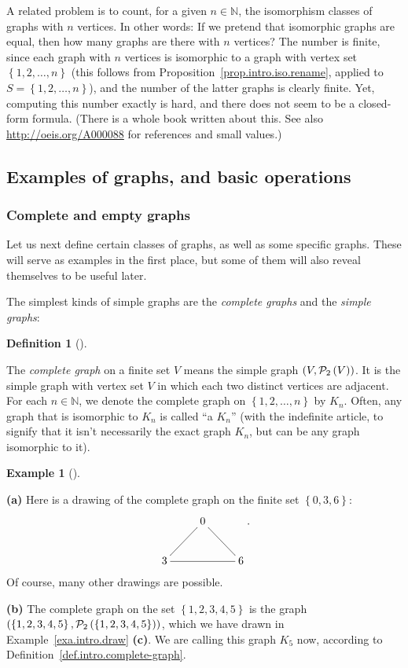 \documentclass[numbers=enddot,12pt,final,onecolumn,notitlepage]{scrartcl}%
\makeatletter
\theoremstyle{definition}
\newtheorem{defi}[theo]{Definition}
\newenvironment{definition}[1][]
{\begin{defi}[#1]\begin{leftbar}}
{\end{leftbar}\end{defi}}
\newtheorem{exam}[theo]{Example}
\newenvironment{example}[1][]
{\begin{exam}[#1]\begin{leftbar}}
{\end{leftbar}\end{exam}}
\newcommand{\NN}{\mathbb{N}}
\newcommand{\powset}[2][]{\ifthenelse{\equal{#2}{}}{\mathcal{P}\left(#1\right)}{\mathcal{P}_{#1}\left(#2\right)}}
\newcommand{\set}[1]{\left\{ #1 \right\}}
\newcommand{\tup}[1]{\left( #1 \right)}
\newcommand{\are}{\ar@{-}}
\makeatother
\begin{document}
A related problem is to count, for a given $n \in \NN$,
the isomorphism classes of graphs with $n$ vertices. In other words:
If we pretend that isomorphic graphs are equal, then how many graphs
are there with $n$ vertices? The number is finite, since each graph
with $n$ vertices is isomorphic to a graph with vertex set
$\set{1,2,\ldots, n}$ (this follows from
Proposition~\ref{prop.intro.iso.rename}, applied to
$S = \set{1,2,\ldots, n}$), and the number of the latter graphs is
clearly finite. Yet, computing this number exactly is hard, and there
does not seem to be a closed-form formula. (There is a whole book
\cite{HarPal73} written about this. See also
\url{http://oeis.org/A000088} for references and small values.)

\subsection{\label{sect.intro.paths}Examples of graphs, and basic
operations}

\subsubsection{Complete and empty graphs}

Let us next define certain classes of graphs, as well as some specific
graphs. These will serve as examples in the first place, but some of
them will also reveal themselves to be useful later.

The simplest kinds of simple graphs are the \textit{complete graphs}
and the \textit{simple graphs}:

\begin{definition} \label{def.intro.complete-graph}
The \textit{complete graph} on a finite set $V$ means
the simple graph $\tup{V, \powset[2]{V}}$. It is the
simple graph with vertex set $V$ in which each two distinct vertices
are adjacent.
For each $n \in \NN$, we denote the complete graph on
$\set{1,2,\ldots,n}$ by $K_n$. Often, any graph that is isomorphic to
$K_n$ is called ``a $K_n$'' (with the indefinite article, to signify
that it isn't necessarily the exact graph $K_n$, but can be any graph
isomorphic to it).
\end{definition}

\begin{example}
\textbf{(a)}
Here is a drawing of the complete graph on the finite set
$\set{0, 3, 6}$:
\begin{align*}
\xymatrix{
& 0 \are[ld] \are[rd] \\
3 \are[rr] & & 6
} .
\end{align*}
Of course, many other drawings are possible.

\textbf{(b)}
The complete graph on the set $\set{1, 2, 3, 4, 5}$ is the graph
$\tup{\set{1, 2, 3, 4, 5}, \powset[2]{\set{1, 2, 3, 4, 5}}}$, which
we have drawn in Example~\ref{exa.intro.draw} \textbf{(c)}.
We are calling this graph $K_5$
now, according to Definition~\ref{def.intro.complete-graph}.
\end{example}
\end{document}
